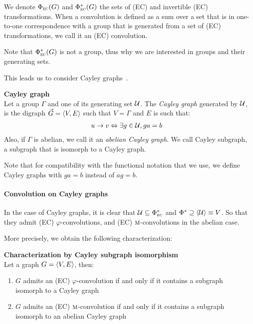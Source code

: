 We denote $\Phi_{\operatorname{\textsc{ec}}}(G)$ and $\Phi^*_{\operatorname{\textsc{ec}}}(G)$ the sets of (EC) and invertible (EC) transformations. When a convolution is defined as a sum over a set that is in one-to-one correspondence with a group that is generated from a set of (EC) transformations, we call it an (EC) convolution.

\begin{remark}
Note that $\Phi^*_{\operatorname{\textsc{ec}}}(G)$ is not a group, thus why we are interested in groups and their generating sets.
\end{remark}

This leads us to consider Cayley graphs~\citep{cayley1878desiderata,wiki:cayley}.

\begin{definition}\textbf{Cayley graph}\\
Let a group $\Gamma$ and one of its generating set $\mathcal{U}$. The \emph{Cayley graph} generated by $\mathcal{U}$, is the digraph $\vec{G} = \langle V, E \rangle$ such that $V = \Gamma$ and $E$ is such that:
\begin{gather*}
u \rightarrow v \Leftrightarrow \exists g \in \mathcal{U}, ga = b
\end{gather*}
Also, if $\Gamma$ is abelian, we call it an \emph{abelian Cayley graph}. We call Cayley subgraph, a subgraph that is isomorph to a Cayley graph.
\end{definition}

\begin{remark}
Note that for compatibility with the functional notation that we use, we define Cayley graphs with $ga = b$ instead of $ag = b$.
\end{remark}

\paragraph{Convolution on Cayley graphs}
In the case of Cayley graphs, it is clear that $\mathcal{U} \subseteq \Phi^*_{\operatorname{\textsc{ec}}}$ and $\Phi^* \supseteq \langle \mathcal{U} \rangle \equiv V$. So that they admit (EC) $\varphi$-convolutions, and (EC) $\operatorname{\textsc{m}}$-convolutions in the abelian case.

More precisely, we obtain the following characterization:

\begin{proposition}\textbf{Characterization by Cayley subgraph isomorphism}\\
Let a graph $G = \langle V, E \rangle$, then:
\begin{enumerate}[label=(\roman*)]
\item $G$ admits an (EC) $\varphi$-convolution if and only if it contains a subgraph isomorph to a Cayley graph
\item $G$ admits an (EC) $\operatorname{\textsc{m}}$-convolution if and only if it contains a subgraph isomorph to an abelian Cayley graph
\end{enumerate}
\end{proposition}


